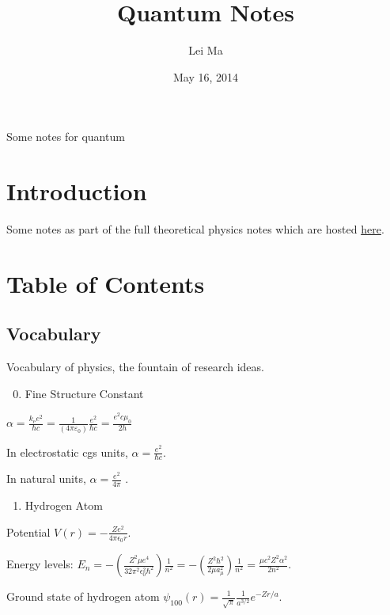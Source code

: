 \documentclass[letterpaper,10pt,english]{sphinxmanual}
\title{Quantum Notes}
\date{May 16, 2014}
\author{Lei Ma}
\begin{document}
\maketitle
\tableofcontents
{}\label{index::doc}


Some notes for quantum


\chapter{Introduction}
\label{index:introduction}\label{index:quantum-notes}
Some notes as part of the full theoretical physics notes which are hosted \href{http://cosmologytaskforce.github.io/PhysicsResearchSurvivalManual/}{here}.


\chapter{Table of Contents}
\label{index:table-of-contents}

\section{Vocabulary}
\label{vocabulary::doc}\label{vocabulary:vocabulary}
Vocabulary of physics, the fountain of research ideas.
\begin{enumerate}
\setcounter{enumi}{-1}
\item {} 
Fine Structure Constant

\end{enumerate}

$\alpha = \frac{k_\mathrm{e} e^2}{\hbar c} = \frac{1}{(4 \pi \varepsilon_0)} \frac{e^2}{\hbar c} = \frac{e^2 c \mu_0}{2 h}$

In electrostatic cgs units, $\alpha = \frac{e^2}{\hbar c}$.

In natural units, $\alpha = \frac{e^2}{4 \pi}$ .
\begin{enumerate}
\item {} 
Hydrogen Atom

\end{enumerate}

Potential $V(r) = -\frac{Z e^2}{4\pi \epsilon_0 r}$.

Energy levels: $E_{n} = -\left(\frac{Z^2 \mu e^4}{32 \pi^2\epsilon_0^2\hbar^2}\right)\frac{1}{n^2} = -\left(\frac{Z^2\hbar^2}{2\mu a_{\mu}^2}\right)\frac{1}{n^2} = \frac{\mu c^2Z^2\alpha^2}{2n^2}.$

Ground state of hydrogen atom $\psi_{100}(r)=\frac{1}{\sqrt{\pi}}\frac{1}{a^{3/2}} e^{-Z r/a}$.
\end{document}
